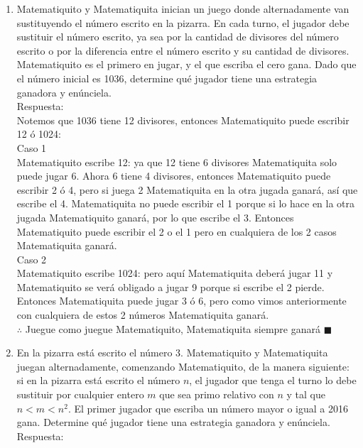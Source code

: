 \documentclass{book}
\begin{document}
\begin{enumerate}
    \item Matematiquito y Matematiquita inician un juego donde alternadamente van sustituyendo el número escrito en la pizarra. En cada turno, el jugador debe sustituir el número escrito, ya sea por la cantidad de divisores del número escrito o por la diferencia entre el número escrito y su cantidad de divisores. Matematiquito es el primero en jugar, y el que escriba el cero gana. Dado que el número inicial es 1036, determine qué jugador tiene una estrategia ganadora y enúnciela.\\
          Respuesta:\\
          Notemos que 1036 tiene 12 divisores, entonces Matematiquito puede escribir 12 ó 1024:\\
          Caso 1\\
          Matematiquito escribe 12: ya que 12 tiene 6 divisores Matematiquita solo puede jugar 6. Ahora 6 tiene 4 divisores, entonces Matematiquito puede escribir 2 ó 4, pero si juega 2 Matematiquita en la otra jugada ganará, así que escribe el 4. Matematiquita no puede escribir el 1 porque si lo hace en la otra jugada Matematiquito ganará, por lo que escribe el 3. Entonces Matematiquito puede escribir el 2 o el 1 pero en cualquiera de los 2 casos Matematiquita ganará. \\
          Caso 2\\
          Matematiquito escribe 1024: pero aquí Matematiquita deberá jugar 11 y Matematiquito se verá obligado a jugar 9 porque si escribe el 2 pierde. Entonces Matematiquita puede jugar 3 ó 6, pero como vimos anteriormente con cualquiera de estos 2 números Matematiquita ganará.\\
          $\therefore$ Juegue como juegue Matematiquito, Matematiquita siempre ganará $\blacksquare$\\
    \item En la pizarra está escrito el número 3. Matematiquito y Matematiquita juegan alternadamente, comenzando Matematiquito, de la manera siguiente: si en la pizarra está escrito el número $n$, el jugador que tenga el turno lo debe sustituir por cualquier entero $m$ que sea primo relativo con $n$ y tal que $n<m<n^2$. El primer jugador que escriba un número mayor o igual a 2016 gana. Determine qué jugador tiene una estrategia ganadora y enúnciela.
          \\Respuesta:\\

\end{enumerate}
\end{document}
